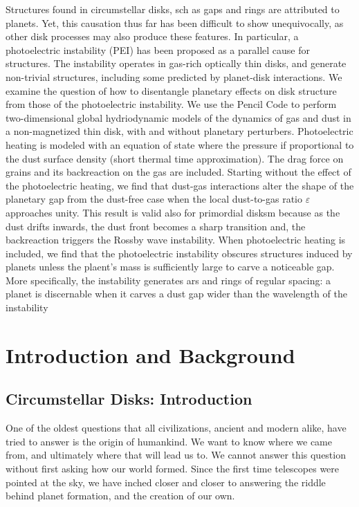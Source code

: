 \documentclass[onecolumn]{report}
\begin{document}
Structures found in circumstellar disks, sch as gaps and rings are attributed to planets. Yet, this causation thus far has been difficult to show unequivocally, as other disk processes may also produce these features. In particular, a photoelectric instability (PEI) has been proposed as a parallel cause for structures. The instability operates in gas-rich optically thin disks, and generate non-trivial structures, including some predicted by planet-disk interactions. We examine the question of how to disentangle planetary effects on disk structure from those of the photoelectric instability. We use the Pencil Code to perform two-dimensional global hydriodynamic models of the dynamics of gas and dust in a non-magnetized thin disk, with and without planetary perturbers. Photoelectric heating is modeled with an equation of state where the pressure if proportional to the dust surface density (short thermal time approximation). The drag force on grains and its backreaction on the gas are included. Starting without the effect of the photoelectric heating, we find that dust-gas interactions alter the shape of the planetary gap from the dust-free case when the local dust-to-gas ratio $\varepsilon$ approaches unity. This result is valid also for primordial disksm because as the dust drifts inwards, the dust front becomes a sharp transition and, the backreaction triggers the Rossby wave instability. When photoelectric heating is included, we find that the photoelectric instability obscures structures induced by planets unless the plaent's mass is sufficiently large to carve a noticeable gap. More specifically, the instability generates ars and rings of regular spacing: a planet is discernable when it carves a dust gap wider than the wavelength of the instability

\chapter{Introduction and Background} %

\setcounter{page}{1}

\section{Circumstellar Disks: Introduction}

One of the oldest questions that all civilizations, ancient and modern alike, have tried to answer is the origin of humankind. We want to know where we came from, and ultimately where that will lead us to. We cannot answer this question without first asking how our world formed. Since the first time telescopes were pointed at the sky, we have inched closer and closer to answering the riddle behind planet formation, and the creation of our own.
\end{document}
